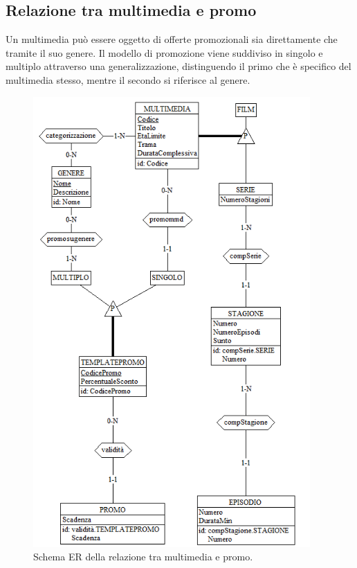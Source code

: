 \documentclass[a4paper,12pt]{report}
\begin{document}
	\subsection{Relazione tra multimedia e promo}
	Un multimedia può essere oggetto di offerte promozionali sia direttamente che tramite il suo genere. Il modello di promozione viene suddiviso in singolo e multiplo attraverso una generalizzazione, distinguendo il primo che è specifico del multimedia stesso, mentre il secondo si riferisce al genere.
	\begin{figure}[H]
		\centering
		\includegraphics[width=300pt]{ER/multimediapromo.png}
		\caption{Schema ER della relazione tra multimedia e promo.}
	\end{figure}
\end{document}
